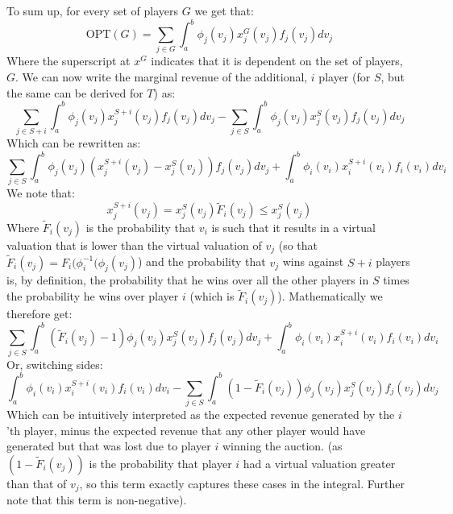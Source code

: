 \documentclass[a4page,notitlepage]{article}
\begin{document}
\begin{enumerate}
  To sum up, for every set of players $G$ we get that:
  \begin{equation*}
    \text{OPT}(G)=\sum_{j\in G}\int_a^b\phi_j(v_j)x_j^G(v_j)f_j(v_j)dv_j
  \end{equation*}
  Where the superscript at $x^G$ indicates that it is dependent on the set of players, $G$.
  We can now write the marginal revenue of the additional, $i$ player (for $S$, but the same can be derived for $T$) as:
  \begin{equation*}
    \sum_{j\in S+{i}}\int_a^b\phi_j(v_j)x_j^{S+{i}}(v_j)f_j(v_j)dv_j-\sum_{j\in S}\int_a^b\phi_j(v_j)x_j^S(v_j)f_j(v_j)dv_j 
  \end{equation*}
  Which can be rewritten as:
  \begin{equation*}
    \sum_{j\in S}\int_a^b\phi_j(v_j)(x_j^{S+{i}}(v_j)-x_j^S(v_j))f_j(v_j)dv_j + \int_a^b\phi_i(v_i)x_i^{S+{i}}(v_i)f_i(v_i)dv_i
  \end{equation*}
  We note that:
  \begin{equation*}
    x_j^{S+i}(v_j)=x_j^S(v_j)\tilde F_i(v_j)\leq x_j^S(v_j)
  \end{equation*}
  Where $\tilde F_i(v_j)$ is the probability that $v_i$ is such that it results in a virtual valuation that is lower than the virtual valuation of $v_j$ (so that $\tilde{F}_i(v_j)=F_i(\phi_i^{-1}(\phi_j(v_j)$) and the probability that $v_j$ wins against $S+i$ players is, by definition, the probability that he wins over all the other players in $S$ times the probability he wins over player $i$ (which is $\tilde F_i(v_j)$).
  Mathematically we therefore get:
  \begin{equation*}
    \sum_{j\in S}\int_a^b(\tilde{F}_i(v_j)-1)\phi_j(v_j)x_j^S(v_j)f_j(v_j)dv_j + \int_a^b\phi_i(v_i)x_i^{S+{i}}(v_i)f_i(v_i)dv_i
  \end{equation*}
  Or, switching sides:
  \begin{equation}
    \label{eq:basic}
     \int_a^b\phi_i(v_i)x_i^{S+{i}}(v_i)f_i(v_i)dv_i-\sum_{j\in S}\int_a^b(1-\tilde{F}_i(v_j))\phi_j(v_j)x_j^S(v_j)f_j(v_j)dv_j
  \end{equation}
  Which can be intuitively interpreted as the expected revenue generated by the $i$'th player, minus the expected revenue that any other player would have generated but that was lost due to player $i$ winning the auction.
(as $(1-\tilde{F}_i(v_j))$ is the probability that player $i$ had a virtual valuation greater than that of $v_j$, so this term exactly captures these cases in the integral. Further note that this term is non-negative).


\end{enumerate}
\end{document}
